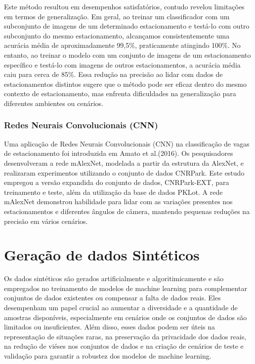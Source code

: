Este método resultou em desempenhos satisfatórios, contudo revelou limitações em termos de generalização. Em geral, ao treinar um classificador com um subconjunto de imagens de um determinado estacionamento e testá-lo com outro subconjunto do mesmo estacionamento, alcançamos consistentemente uma acurácia média de aproximadamente 99,5\%, praticamente atingindo 100\%. No entanto, ao treinar o modelo com um conjunto de imagens de um estacionamento específico e testá-lo com imagens de outros estacionamentos, a acurácia média caiu para cerca de 85\%. Essa redução na precisão ao lidar com dados de estacionamentos distintos sugere que o método pode ser eficaz dentro do mesmo contexto de estacionamento, mas enfrenta dificuldades na generalização para diferentes ambientes ou cenários.

\subsubsection{Redes Neurais Convolucionais (CNN)}

Uma aplicação de Redes Neurais Convolucionais (CNN) na classificação de vagas de estacionamento foi introduzida em Amato et al.(2016). Os pesquisadores desenvolveram a rede mAlexNet, modelada a partir da estrutura da AlexNet, e realizaram experimentos utilizando o conjunto de dados CNRPark. Este estudo empregou a versão expandida do conjunto de dados, CNRPark-EXT, para treinamento e teste, além da utilização da base de dados PKLot. A rede mAlexNet demonstrou habilidade para lidar com as variações presentes nos estacionamentos e diferentes ângulos de câmera, mantendo pequenas reduções na precisão em vários cenários.


\section{Geração de dados Sintéticos}

Os dados sintéticos são gerados artificialmente e algoritimicamente e são empregados no treinamento de modelos de machine learning para complementar conjuntos de dados existentes ou compensar a falta de dados reais. Eles desempenham um papel crucial ao aumentar a diversidade e a quantidade de amostras disponíveis, especialmente em cenários onde os conjuntos de dados são limitados ou insuficientes. Além disso, esses dados podem ser úteis na representação de situações raras, na preservação da privacidade dos dados reais, na redução de viéses nos conjuntos de dados e na criação de cenários de teste e validação para garantir a robustez dos modelos de machine learning.

